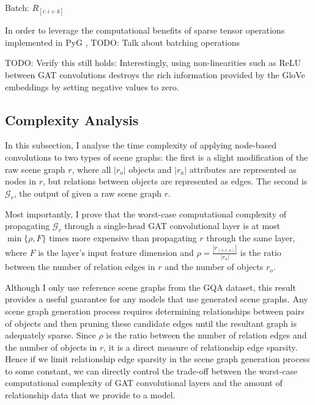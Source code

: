 Batch: \(R_{[i:i+k]}\)

In order to leverage the computational benefits of sparse tensor operations implemented in PyG \cite{fey2019fast},
{\color{red} TODO: Talk about batching operations}


{\color{red} TODO: Verify this still holds: Interestingly, using non-linearities such as ReLU between GAT convolutions destroys the rich information provided by the GloVe embeddings by setting negative values to zero.}

\subsection{Complexity Analysis}
\label{sec:scene_graph_complexity_analysis}

In this subsection, I analyse the time complexity of applying node-based convolutions to two types of scene graphs: the first is a slight modification of the raw scene graph \(r\), where all \(|r_o|\) objects and \(|r_a|\) attributes are represented as nodes in \(r\), but relations between objects are represented as edges. The second is \(\mathcal{G}_r\), the output of \algorithmcfname{ \ref{algorithm:scene_graph_construction}} given a raw scene graph \(r\).

Most importantly, I prove that the worst-case computational complexity of propagating \(\mathcal{G}_r\) through a single-head GAT convolutional layer is at most \(\min\{\rho, F\}\) times more expensive than propagating \(r\) through the same layer, where \(F\) is the layer's input feature dimension and \(\rho = \frac{|r_{(s,r,o)}|}{|r_o|}\) is the ratio between the number of relation edges in \(r\) and the number of objects \(r_o\).

Although I only use reference scene graphs from the GQA dataset, this result provides a useful guarantee for any models that use generated scene graphs. Any scene graph generation process requires determining relationships between pairs of objects and then pruning these candidate edges until the resultant graph is adequately sparse. Since \(\rho\) is the ratio between the number of relation edges and the number of objects in \(r\), it is a direct measure of relationship edge sparsity. Hence if we limit relationship edge sparsity in the scene graph generation process to some constant, we can directly control the trade-off between the worst-case computational complexity of GAT convolutional layers and the amount of relationship data that we provide to a model.

